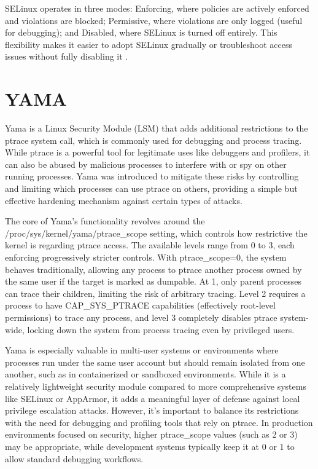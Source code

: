 \documentclass[12pt]{report}
\begin{document}
\begin{doublespace}
SELinux operates in three modes: Enforcing, where policies are actively enforced and violations are blocked; Permissive, where violations are only logged (useful for debugging); and Disabled, where SELinux is turned off entirely. This flexibility makes it easier to adopt SELinux gradually or troubleshoot access issues without fully disabling it \cite{redhat2007selinuxguide}.












\section{YAMA}


Yama is a Linux Security Module (LSM) that adds additional restrictions to the ptrace system call, which is commonly used for debugging and process tracing. While ptrace is a powerful tool for legitimate uses like debuggers and profilers, it can also be abused by malicious processes to interfere with or spy on other running processes. Yama was introduced to mitigate these risks by controlling and limiting which processes can use ptrace on others, providing a simple but effective hardening mechanism against certain types of attacks.

The core of Yama’s functionality revolves around the /proc/sys/kernel/yama/ptrace\_scope setting, which controls how restrictive the kernel is regarding ptrace access. The available levels range from 0 to 3, each enforcing progressively stricter controls. With ptrace\_scope=0, the system behaves traditionally, allowing any process to ptrace another process owned by the same user if the target is marked as dumpable. At 1, only parent processes can trace their children, limiting the risk of arbitrary tracing. Level 2 requires a process to have CAP\_SYS\_PTRACE capabilities (effectively root-level permissions) to trace any process, and level 3 completely disables ptrace system-wide, locking down the system from process tracing even by privileged users.

Yama is especially valuable in multi-user systems or environments where processes run under the same user account but should remain isolated from one another, such as in containerized or sandboxed environments. While it is a relatively lightweight security module compared to more comprehensive systems like SELinux or AppArmor, it adds a meaningful layer of defense against local privilege escalation attacks. However, it’s important to balance its restrictions with the need for debugging and profiling tools that rely on ptrace. In production environments focused on security, higher ptrace\_scope values (such as 2 or 3) may be appropriate, while development systems typically keep it at 0 or 1 to allow standard debugging workflows.


\end{doublespace}
\end{document}
